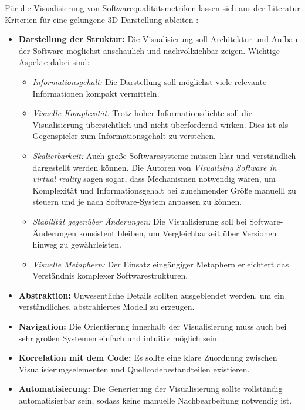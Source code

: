 Für die Visualisierung von Softwarequalitätsmetriken lassen sich aus der Literatur Kriterien für eine gelungene 3D-Darstellung ableiten \cite{visSoftwareVR}:
\begin{itemize}
    \item \textbf{Darstellung der Struktur:} Die Visualisierung soll Architektur und Aufbau der Software möglichst anschaulich und nachvollziehbar zeigen. Wichtige Aspekte dabei sind:
    \begin{itemize}
        \item \emph{Informationsgehalt:} Die Darstellung soll möglichst viele relevante Informationen kompakt vermitteln.
        \item \emph{Visuelle Komplexität:} Trotz hoher Informationsdichte soll die Visualisierung übersichtlich und nicht überfordernd wirken. Dies ist als Gegenspieler zum Informationsgehalt zu verstehen.
        \item \emph{Skalierbarkeit:} Auch große Softwaresysteme müssen klar und verständlich dargestellt werden können. Die Autoren von \textit{Visualising Software in virtual reality} \cite{visSoftwareVR} sagen sogar, dass Mechanismen notwendig wären, um Komplexität und Informationsgehalt bei zunehmender Größe manuelll zu steuern und je nach Software-System anpassen zu können.
        \item \emph{Stabilität gegenüber Änderungen:} Die Visualisierung soll bei Software-Änderungen konsistent bleiben, um Vergleichbarkeit über Versionen hinweg zu gewährleisten.
        \item \emph{Visuelle Metaphern:} Der Einsatz eingängiger Metaphern erleichtert das Verständnis komplexer Softwarestrukturen.
    \end{itemize}
    \item \textbf{Abstraktion:} Unwesentliche Details sollten ausgeblendet werden, um ein verständliches, abstrahiertes Modell zu erzeugen.
    \item \textbf{Navigation:} Die Orientierung innerhalb der Visualisierung muss auch bei sehr großen Systemen einfach und intuitiv möglich sein.
    \item \textbf{Korrelation mit dem Code:} Es sollte eine klare Zuordnung zwischen Visualisierungselementen und Quellcodebestandteilen existieren.
    \item \textbf{Automatisierung:} Die Generierung der Visualisierung sollte vollständig automatisierbar sein, sodass keine manuelle Nachbearbeitung notwendig ist.
\end{itemize}

